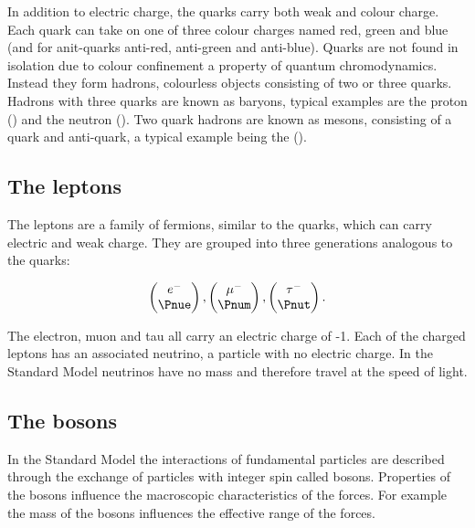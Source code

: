 In addition to electric charge, the quarks carry both weak and colour charge. Each quark can take on one of three colour charges named red, green and blue (and for anit-quarks anti-red, anti-green and anti-blue). Quarks are not found in isolation due to colour confinement a property of quantum chromodynamics. Instead they form hadrons, colourless objects consisting of two or three quarks. Hadrons with three quarks are known as baryons, typical examples are the proton (\Pup\Pup\Pdown) and the neutron (\Pup\Pdown\Pdown). Two quark hadrons are known as mesons, consisting of a quark and anti-quark, a typical example being the  \Ppiplus (\Pup\APdown).

\subsection{The leptons}
\label{section:particle-physics:SM:leptons}

The leptons are a family of fermions, similar to the quarks, which can carry electric and weak charge. They are grouped into three generations analogous to the quarks:


\begin{equation}
  \begin{pmatrix}
    e^{-} \\
    \Pnue
  \end{pmatrix}
  ,
  \begin{pmatrix}
    \mu^{-} \\
    \Pnum
  \end{pmatrix}
  ,
  \begin{pmatrix}
    \tau^{-} \\
    \Pnut
  \end{pmatrix}
.
\end{equation}

\noindent
The electron, muon and tau all carry an electric charge of -1. Each of the charged leptons has an associated neutrino, a particle with no electric charge. In the Standard Model neutrinos have no mass and therefore travel at the speed of light.


\subsection{The bosons}
\label{section:particle-physics:SM:bosons}

In the Standard Model the interactions of fundamental particles are described through the exchange of particles with integer spin called bosons. Properties of the bosons influence the macroscopic characteristics of the forces. For example the mass of the bosons influences the effective range of the forces.

